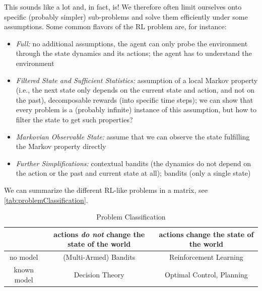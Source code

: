 		This sounds like a lot and, in fact, is! We therefore often limit ourselves onto specific (probably simpler) sub-problems and solve them efficiently under some assumptions. Some common flavors of the \ac{RL} problem are, for instance:
		\begin{itemize}
			\item \emph{Full:} no additional assumptions, the agent can only probe the environment through the state dynamics and its actions; the agent has to understand the environment
			\item \emph{Filtered State and Sufficient Statistics:} assumption of a local Markov property (i.e., the next state only depends on the current state and action, and not on the past), decomposable rewards (into specific time steps); we can show that every problem is a (probably infinite) instance of this assumption, but how to filter the state to get such properties?
			\item \emph{Markovian Observable State:} assume that we can observe the state fulfilling the Markov property directly
			\item \emph{Further Simplifications:} contextual bandits (the dynamics do not depend on the action or the past and current state at all); bandits (only a single state)
		\end{itemize}
		We can summarize the different \ac{RL}-like problems in a matrix, see \autoref{tab:problemClassification}.

		\begin{table}
			\centering
			\begin{tabular}{c||cc}
				\toprule
				            & actions \emph{do not} change the state of the world & actions change the state of the world \\ \midrule
				 no model   &                (Multi-Armed) Bandits                &        Reinforcement Learning         \\
				known model &                   Decision Theory                   &       Optimal Control, Planning       \\ \bottomrule
			\end{tabular}
			\caption{Problem Classification}
			\label{tab:problemClassification}
		\end{table}

